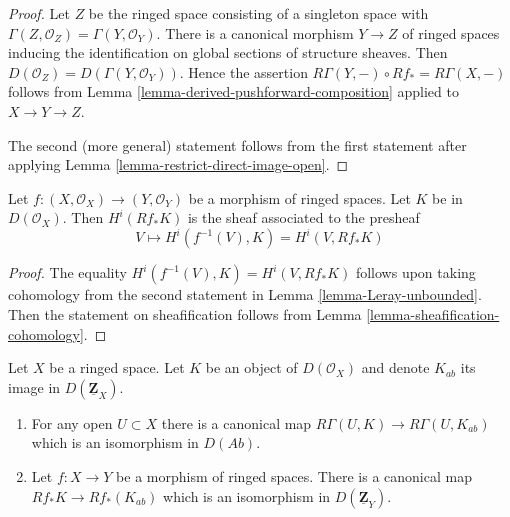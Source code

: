\begin{proof}
Let $Z$ be the ringed space consisting of a singleton
space with $\Gamma(Z, \mathcal{O}_Z) = \Gamma(Y, \mathcal{O}_Y)$.
There is a canonical morphism $Y \to Z$ of ringed spaces
inducing the identification on global sections of structure sheaves.
Then $D(\mathcal{O}_Z) = D(\Gamma(Y, \mathcal{O}_Y))$.
Hence the assertion $R\Gamma(Y, -) \circ Rf_* = R\Gamma(X, -)$
follows from Lemma \ref{lemma-derived-pushforward-composition}
applied to $X \to Y \to Z$.

\medskip\noindent
The second (more general) statement follows from the first statement
after applying Lemma \ref{lemma-restrict-direct-image-open}.
\end{proof}

\begin{lemma}
\label{lemma-unbounded-describe-higher-direct-images}
Let $f : (X, \mathcal{O}_X) \to (Y, \mathcal{O}_Y)$ be a morphism of ringed
spaces. Let $K$ be in $D(\mathcal{O}_X)$. Then $H^i(Rf_*K)$ is the sheaf
associated to the presheaf
$$
V \mapsto H^i(f^{-1}(V), K) = H^i(V, Rf_*K)
$$
\end{lemma}

\begin{proof}
The equality $H^i(f^{-1}(V), K) = H^i(V, Rf_*K)$ follows upon taking
cohomology from the second statement in
Lemma \ref{lemma-Leray-unbounded}. Then the statement on sheafification
follows from Lemma \ref{lemma-sheafification-cohomology}.
\end{proof}

\begin{lemma}
\label{lemma-modules-abelian-unbounded}
Let $X$ be a ringed space. Let $K$ be an object of $D(\mathcal{O}_X)$
and denote $K_{ab}$ its image in $D(\underline{\mathbf{Z}}_X)$.
\begin{enumerate}
\item For any open $U \subset X$ there is a canonical map
$R\Gamma(U, K) \to R\Gamma(U, K_{ab})$
which is an isomorphism in $D(\textit{Ab})$.
\item Let $f : X \to Y$ be a morphism of ringed spaces.
There is a canonical map $Rf_*K \to Rf_*(K_{ab})$ which
is an isomorphism in $D(\underline{\mathbf{Z}}_Y)$.
\end{enumerate}
\end{lemma}

